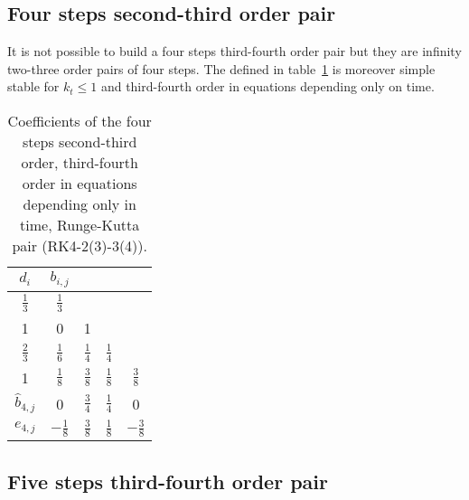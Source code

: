 \documentclass[a4paper]{article}
\begin{document}
\subsection{Four steps second-third order pair}

It is not possible to build a four steps third-fourth order pair but they are
infinity two-three order pairs of four steps. The defined in
table~\ref{TableRKIIivIII} is moreover simple stable for $k_t\leq1$ and 
third-fourth order in equations depending only on time.
\begin{table}[ht]
	\renewcommand*{\arraystretch}{1.3}
	\centering
	\begin{tabular}{c|cccc}
		$d_{i}$ & $b_{i,j}$ \\ \hline
		$\frac13$ & $\frac13$ \\
		1 & 0 & 1 \\
		$\frac23$ & $\frac16$ & $\frac14$ & $\frac14$ \\
		1 & $\frac18$ & $\frac38$ & $\frac18$ & $\frac38$ \\ \hline
		$\hat{b}_{4,j}$ & 0 & $\frac34$ & $\frac14$ & 0 \\ \hline
		$e_{4,j}$ & $-\frac18$ & $\frac38$ & $\frac18$ & $-\frac38$
	\end{tabular}
	\caption{Coefficients of the four steps second-third order, third-fourth order
		in equations depending only in time, Runge-Kutta pair (RK4-2(3)-3(4)).
		\label{TableRKIIivIII}}
\end{table}

\subsection{Five steps third-fourth order pair}
\end{document}
